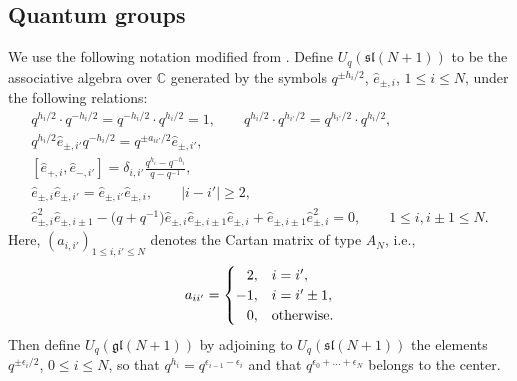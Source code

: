 \subsection{Quantum groups}
We use the following notation modified from \cite{Jimbo1986}.
Define $ U_q(\mathfrak{sl}(N+1)) $ to be the associative algebra over $ \mathbb{C} $ generated by the symbols $ q^{\pm h_i/2}$, $\hat{e}_{\pm, i}$, $1 \leq i\leq N$, under the following relations:
\begin{gather*}
q^{h_i/2} \cdot q^{-h_i/2}= q^{-h_i/2} \cdot q^{h_i/2}=1, \qquad q^{h_i/2} \cdot q^{h_{i'}/2}= q^{h_{i'}/2} \cdot q^{h_i/2},\nonumber\\
 q^{h_i/2} \hat{e}_{\pm, i'} q^{-h_i/2}= q^{\pm a_{ii'}/2} \hat{e}_{\pm, i'},\nonumber\\
[\hat{e}_{+,i}, \hat{e}_{-,i'}] =\delta_{i,i'} \frac{q^{h_i}-q^{-h_i}}{q-q^{-1}}, \nonumber\\
 \hat{e}_{\pm, i}\hat{e}_{\pm, i'} = \hat{e}_{\pm ,i'}\hat{e}_{\pm ,i}, \qquad |i-i'|\geq 2, \nonumber\\
 \hat{e}_{\pm, i}^2 \hat{e}_{\pm, i\pm 1} -\big(q+q^{-1}\big) \hat{e}_{\pm, i} \hat{e}_{\pm ,i\pm 1} \hat{e}_{\pm ,i} + \hat{e}_{\pm, i\pm 1} \hat{e}_{\pm, i}^2=0,\qquad 1\leq i, i\pm 1 \leq N. %
\end{gather*}
Here, $ (a_{i,i'})_{1\leq i,i' \leq N} $ denotes the Cartan matrix of type $ A_N $, i.e.,
\begin{equation*}
a_{ii'}=
\begin{cases}
\hphantom{-}2,& i = i',\\ -1, & i=i' \pm 1,\\ \hphantom{-}0,& \text{otherwise}.
\end{cases}
\end{equation*}
Then define $ U_q(\mathfrak{gl}(N+1)) $ by adjoining to $ U_q(\mathfrak{sl}(N+1)) $ the elements $ q^{\pm \epsilon_i/2}$, $0 \leq i \leq N $, so that $ q^{h_i}= q^{\epsilon_{i-1}-\epsilon_i} $ and that $ q^{\epsilon_0+\dots +\epsilon_N} $ belongs to the center.

